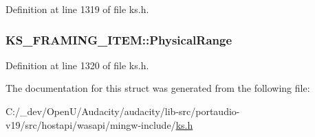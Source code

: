 Definition at line 1319 of file ks.\+h.

\subsubsection[{\texorpdfstring{Physical\+Range}{PhysicalRange}}]{ K\+S\+\_\+\+F\+R\+A\+M\+I\+N\+G\+\_\+\+I\+T\+E\+M\+::\+Physical\+Range}\hypertarget{struct_k_s___f_r_a_m_i_n_g___i_t_e_m_a06823370f24c9d5bbb3e22db619a0411}{}\label{struct_k_s___f_r_a_m_i_n_g___i_t_e_m_a06823370f24c9d5bbb3e22db619a0411}


Definition at line 1320 of file ks.\+h.



The documentation for this struct was generated from the following file\+:\begin{DoxyCompactItemize}
\item 
C\+:/\+\_\+dev/\+Open\+U/\+Audacity/audacity/lib-\/src/portaudio-\/v19/src/hostapi/wasapi/mingw-\/include/\hyperlink{ks_8h}{ks.\+h}\end{DoxyCompactItemize}
